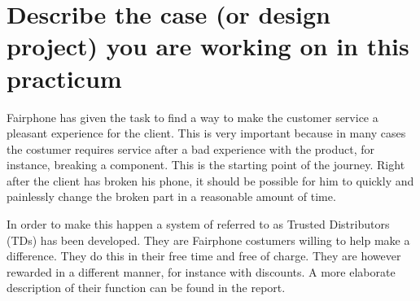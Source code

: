 \section{Describe the case (or design project) you are working on in this practicum}
Fairphone has given the task to find a way to make the customer service a pleasant experience for the client. This is very important because in many cases the costumer requires service after a bad experience with the product, for instance, breaking a component. This is the starting point of the journey. Right after the client has broken his phone, it should be possible for him to quickly and painlessly change the broken part in a reasonable amount of time.

In order to make this happen a system of referred to as Trusted Distributors (TDs) has been developed. They are Fairphone costumers willing to help make a difference. They do this in their free time and free of charge. They are however rewarded in a different manner, for instance with discounts. A more elaborate description of their function can be found in the report. 